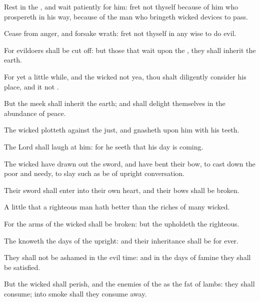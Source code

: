{\Q {}Rest in the
{}, and wait
patiently for him:
fret not thyself because of him who
prospereth in his
way, because of the
man who
bringeth wicked
devices to
pass.


\par }{\Q {}Cease from
anger, and
forsake
wrath:
fret not thyself in any
wise to do
evil.


\par }{\Q {}For
evildoers shall be cut
off: but those that
wait upon the
{}, they shall
inherit the
earth.


\par }{\Q {}For yet a little
while, and the
wicked
{} not
{} yea, thou shalt diligently
consider his
place, and it
{} not
{}.


\par }{\Q {}But the
meek shall
inherit the
earth; and shall
delight themselves in the
abundance of
peace.


\par }{\Q {}The
wicked
plotteth against the
just, and
gnasheth upon him with his
teeth.


\par }{\Q {}The
Lord shall
laugh at him: for he
seeth that his
day is
coming.


\par }{\Q {}The
wicked have drawn
out the
sword, and have
bent their
bow, to cast
down the
poor and
needy,
{} to
slay such as be of
upright
conversation.


\par }{\Q {}Their
sword shall
enter into their own
heart, and their
bows shall be
broken.


\par }{\Q {}A
little that a righteous
man hath
{}
better than the
riches of
many
wicked.


\par }{\Q {}For the
arms of the
wicked shall be
broken: but the
{}
upholdeth the
righteous.


\par }{\Q {}The
{}
knoweth the
days of the
upright: and their
inheritance shall be for
ever.


\par }{\Q {}They shall not be
ashamed in the
evil
time: and in the
days of
famine they shall be
satisfied.


\par }{\Q {}But the
wicked shall
perish, and the
enemies of the
{}
{} as the
fat of
lambs: they shall
consume; into
smoke shall they consume
away.


\par }{\BB \par }
